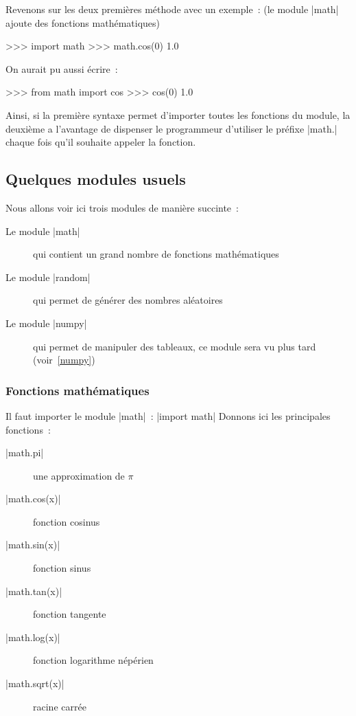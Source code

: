 		Revenons sur les deux premières méthode avec un exemple~: (le module \python|math| ajoute des fonctions mathématiques)
		\begin{pythoncode}
			>>> import math
			>>> math.cos(0)
			1.0
		\end{pythoncode}
		
		On aurait pu aussi écrire~:
		\begin{pythoncode}
			>>> from math import cos
			>>> cos(0)
			1.0
		\end{pythoncode}

		Ainsi, si la première syntaxe permet d'importer toutes les fonctions du module, la deuxième a l'avantage de dispenser le programmeur d'utiliser le préfixe \python|math.| chaque fois qu'il souhaite appeler la fonction.
	
	\subsection{Quelques modules usuels}
	
		Nous allons voir ici trois modules de manière succinte~:
		\begin{description}
			\item[Le module \python|math|] qui contient un grand nombre de fonctions mathématiques
			\item[Le module \python|random|] qui permet de générer des nombres aléatoires
			\item[Le module \python|numpy|] qui permet de manipuler des tableaux, ce module sera vu plus tard (voir~\ref{numpy})
		\end{description}
		
		\subsubsection{Fonctions mathématiques}
		Il faut importer le module \python|math|~: \python|import math|
		Donnons ici les principales fonctions~:
		\begin{description}
			\item[\python|math.pi|] une approximation de $\pi$
			\item[\python|math.cos(x)|] fonction cosinus
			\item[\python|math.sin(x)|] fonction sinus
			\item[\python|math.tan(x)|] fonction tangente
			\item[\python|math.log(x)|] fonction logarithme népérien
			\item[\python|math.sqrt(x)|] racine carrée
		\end{description}
		
